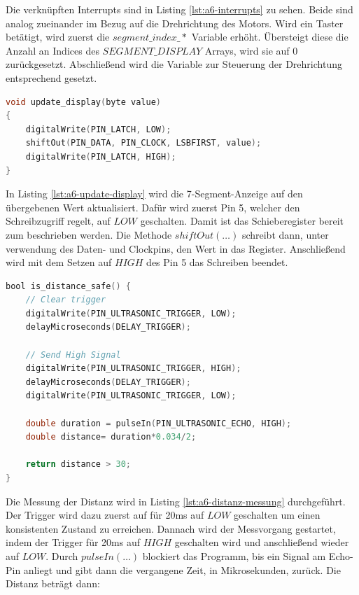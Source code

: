 Die verknüpften Interrupts sind in Listing \ref{lst:a6-interrupts} zu sehen.
Beide sind analog zueinander im Bezug auf die Drehrichtung des Motors.
Wird ein Taster betätigt, wird zuerst die $segment\_index\_*$ Variable erhöht.
Übersteigt diese die Anzahl an Indices des $SEGMENT\_DISPLAY$ Arrays, wird sie auf 0 zurückgesetzt.
Abschließend wird die Variable zur Steuerung der Drehrichtung entsprechend gesetzt.

\begin{lstlisting}[language=C,label={lst:a6-update-display}, caption={Aktualisierung der 7-Segment-Anzeige}]
void update_display(byte value)
{
    digitalWrite(PIN_LATCH, LOW);
    shiftOut(PIN_DATA, PIN_CLOCK, LSBFIRST, value);
    digitalWrite(PIN_LATCH, HIGH);
}
\end{lstlisting}

In Listing \ref{lst:a6-update-display} wird die 7-Segment-Anzeige auf den übergebenen Wert aktualisiert.
Dafür wird zuerst Pin 5, welcher den Schreibzugriff regelt, auf $LOW$ geschalten.
Damit ist das Schieberegister bereit zum beschrieben werden.
Die Methode $shiftOut(\dots)$ schreibt dann, unter verwendung des Daten- und Clockpins, den Wert in das Register.
Anschließend wird mit dem Setzen auf $HIGH$ des Pin 5 das Schreiben beendet.

\begin{lstlisting}[language=C,label={lst:a6-distanz-messung}, caption={Distanz Messung}]
bool is_distance_safe() {
    // Clear trigger
    digitalWrite(PIN_ULTRASONIC_TRIGGER, LOW);
    delayMicroseconds(DELAY_TRIGGER);

    // Send High Signal
    digitalWrite(PIN_ULTRASONIC_TRIGGER, HIGH);
    delayMicroseconds(DELAY_TRIGGER);
    digitalWrite(PIN_ULTRASONIC_TRIGGER, LOW);

    double duration = pulseIn(PIN_ULTRASONIC_ECHO, HIGH);
    double distance= duration*0.034/2;

    return distance > 30;
}
\end{lstlisting}

Die Messung der Distanz wird in Listing \ref{lst:a6-distanz-messung} durchgeführt.
Der Trigger wird dazu zuerst auf für 20ms auf $LOW$ geschalten um einen konsistenten Zustand zu erreichen.
Dannach wird der Messvorgang gestartet, indem der Trigger für 20ms auf $HIGH$ geschalten wird und anschließend wieder auf $LOW$.
Durch $pulseIn(\dots)$ blockiert das Programm, bis ein Signal am Echo-Pin anliegt und gibt dann die vergangene Zeit, in Mikrosekunden, zurück.
Die Distanz beträgt dann:

